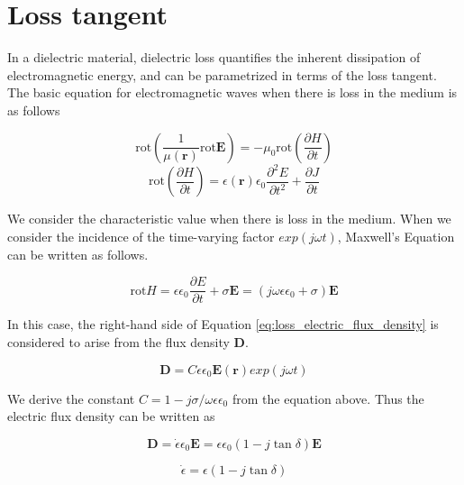 \documentclass[a4paper,12pt]{report}
\begin{document}
\section{Loss tangent}

In a dielectric material, dielectric loss quantifies the inherent dissipation
of electromagnetic energy, and can be parametrized in terms of the loss tangent.
The basic equation for electromagnetic waves
when there is loss in the medium is as follows

\begin{equation}
  \mathrm{rot}(\frac{1}{\mu(\boldsymbol{r})}\mathrm{rot}\boldsymbol{E}) = -\mu_0 \mathrm{rot}(\frac{\partial H}{\partial t})
\end{equation}
\begin{equation}
  \mathrm{rot}(\frac{\partial H}{\partial t}) = \epsilon(\boldsymbol{r})\epsilon_0 \frac{\partial^2 E}{\partial t^2} + \frac{\partial J}{\partial t}
\end{equation}


We consider the characteristic value when there is loss in the medium.
When we consider the incidence of the time-varying factor $exp(j\omega t)$,
Maxwell's Equation can be written as follows.

\begin{equation} \label{eq:loss_electric_flux_density}
  \mathrm{rot} H = \epsilon \epsilon_0 \frac{\partial E}{\partial t} + \sigma \boldsymbol{E} = (j\omega\epsilon\epsilon_0 + \sigma)\boldsymbol{E}
\end{equation}

In this case, the right-hand side of Equation \ref{eq:loss_electric_flux_density}
is considered to arise from the flux density $\boldsymbol{D}$.

\begin{equation} \label{eq:electric_flux_density}
  \boldsymbol{D} = C\epsilon \epsilon_0 \boldsymbol{E}(\boldsymbol{r})exp(j\omega t)
\end{equation}

We derive the constant $C=1 - j\sigma / \omega\epsilon\epsilon_0$ from the equation above.
Thus the electric flux density can be written as

\begin{equation} \label{eq:electric_flux_density_tangent_delta}
  \boldsymbol{D} = \dot{\epsilon} \epsilon_0 \boldsymbol{E} = \epsilon \epsilon_0 (1 - j\tan\delta)\boldsymbol{E}
\end{equation}

\begin{equation} \label{eq:epsilon_dot}
  \dot{\epsilon} = \epsilon (1 - j\tan\delta)
\end{equation}
\end{document}
